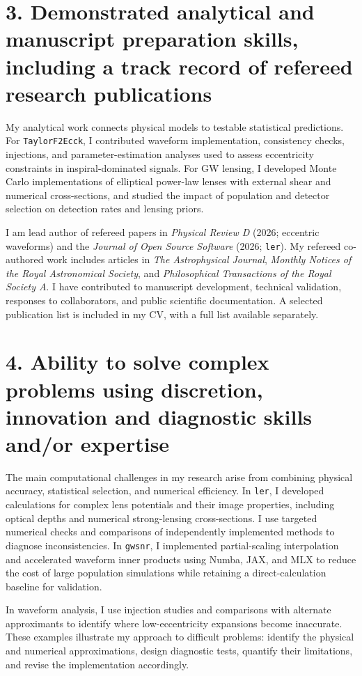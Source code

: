 \documentclass[10pt]{article}
\begin{document}
\section*{3. Demonstrated analytical and manuscript preparation skills, including a track record of refereed research publications}
My analytical work connects physical models to testable statistical predictions. For \texttt{TaylorF2Ecck}, I contributed waveform implementation, consistency checks, injections, and parameter-estimation analyses used to assess eccentricity constraints in inspiral-dominated signals. For GW lensing, I developed Monte Carlo implementations of elliptical power-law lenses with external shear and numerical cross-sections, and studied the impact of population and detector selection on detection rates and lensing priors.

I am lead author of refereed papers in \textit{Physical Review D} (2026; eccentric waveforms) and the \textit{Journal of Open Source Software} (2026; \texttt{ler}). My refereed co-authored work includes articles in \textit{The Astrophysical Journal}, \textit{Monthly Notices of the Royal Astronomical Society}, and \textit{Philosophical Transactions of the Royal Society A}. I have contributed to manuscript development, technical validation, responses to collaborators, and public scientific documentation. A selected publication list is included in my CV, with a full list available separately.

\section*{4. Ability to solve complex problems using discretion, innovation and diagnostic skills and/or expertise}
The main computational challenges in my research arise from combining physical accuracy, statistical selection, and numerical efficiency. In \texttt{ler}, I developed calculations for complex lens potentials and their image properties, including optical depths and numerical strong-lensing cross-sections. I use targeted numerical checks and comparisons of independently implemented methods to diagnose inconsistencies. In \texttt{gwsnr}, I implemented partial-scaling interpolation and accelerated waveform inner products using Numba, JAX, and MLX to reduce the cost of large population simulations while retaining a direct-calculation baseline for validation.

In waveform analysis, I use injection studies and comparisons with alternate approximants to identify where low-eccentricity expansions become inaccurate. These examples illustrate my approach to difficult problems: identify the physical and numerical approximations, design diagnostic tests, quantify their limitations, and revise the implementation accordingly.
\end{document}

